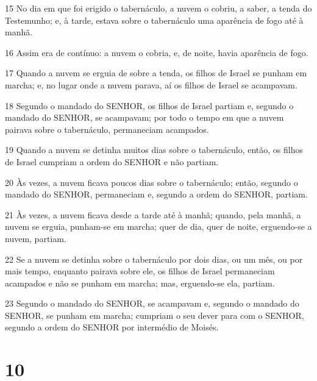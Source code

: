 \par 15 No dia em que foi erigido o tabernáculo, a nuvem o cobriu, a saber, a tenda do Testemunho; e, à tarde, estava sobre o tabernáculo uma aparência de fogo até à manhã.
\par 16 Assim era de contínuo: a nuvem o cobria, e, de noite, havia aparência de fogo.
\par 17 Quando a nuvem se erguia de sobre a tenda, os filhos de Israel se punham em marcha; e, no lugar onde a nuvem parava, aí os filhos de Israel se acampavam.
\par 18 Segundo o mandado do SENHOR, os filhos de Israel partiam e, segundo o mandado do SENHOR, se acampavam; por todo o tempo em que a nuvem pairava sobre o tabernáculo, permaneciam acampados.
\par 19 Quando a nuvem se detinha muitos dias sobre o tabernáculo, então, os filhos de Israel cumpriam a ordem do SENHOR e não partiam.
\par 20 Às vezes, a nuvem ficava poucos dias sobre o tabernáculo; então, segundo o mandado do SENHOR, permaneciam e, segundo a ordem do SENHOR, partiam.
\par 21 Às vezes, a nuvem ficava desde a tarde até à manhã; quando, pela manhã, a nuvem se erguia, punham-se em marcha; quer de dia, quer de noite, erguendo-se a nuvem, partiam.
\par 22 Se a nuvem se detinha sobre o tabernáculo por dois dias, ou um mês, ou por mais tempo, enquanto pairava sobre ele, os filhos de Israel permaneciam acampados e não se punham em marcha; mas, erguendo-se ela, partiam.
\par 23 Segundo o mandado do SENHOR, se acampavam e, segundo o mandado do SENHOR, se punham em marcha; cumpriam o seu dever para com o SENHOR, segundo a ordem do SENHOR por intermédio de Moisés.

\chapter{10}

